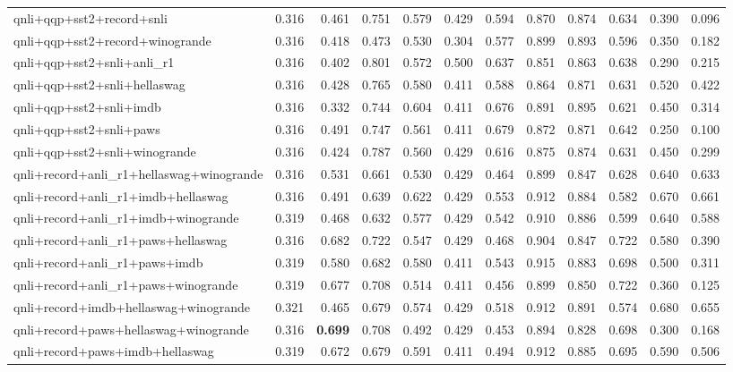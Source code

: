 \begin{table}[t]
\begin{tabular}{lrrrrrrrrrrr}
    qnli+qqp+sst2+record+snli & 0.316 & 0.461 & 0.751 & 0.579 & 0.429 & 0.594 & 0.870 & 0.874 & 0.634 & 0.390 & 0.096 \\
    qnli+qqp+sst2+record+winogrande & 0.316 & 0.418 & 0.473 & 0.530 & 0.304 & 0.577 & 0.899 & 0.893 & 0.596 & 0.350 & 0.182 \\
    qnli+qqp+sst2+snli+anli\_r1 & 0.316 & 0.402 & 0.801 & 0.572 & 0.500 & 0.637 & 0.851 & 0.863 & 0.638 & 0.290 & 0.215 \\
    qnli+qqp+sst2+snli+hellaswag & 0.316 & 0.428 & 0.765 & 0.580 & 0.411 & 0.588 & 0.864 & 0.871 & 0.631 & 0.520 & 0.422 \\
    qnli+qqp+sst2+snli+imdb & 0.316 & 0.332 & 0.744 & 0.604 & 0.411 & 0.676 & 0.891 & 0.895 & 0.621 & 0.450 & 0.314 \\
    qnli+qqp+sst2+snli+paws & 0.316 & 0.491 & 0.747 & 0.561 & 0.411 & 0.679 & 0.872 & 0.871 & 0.642 & 0.250 & 0.100 \\
    qnli+qqp+sst2+snli+winogrande & 0.316 & 0.424 & 0.787 & 0.560 & 0.429 & 0.616 & 0.875 & 0.874 & 0.631 & 0.450 & 0.299 \\
    qnli+record+anli\_r1+hellaswag+winogrande & 0.316 & 0.531 & 0.661 & 0.530 & 0.429 & 0.464 & 0.899 & 0.847 & 0.628 & 0.640 & 0.633 \\
    qnli+record+anli\_r1+imdb+hellaswag & 0.316 & 0.491 & 0.639 & 0.622 & 0.429 & 0.553 & 0.912 & 0.884 & 0.582 & 0.670 & 0.661 \\
    qnli+record+anli\_r1+imdb+winogrande & 0.319 & 0.468 & 0.632 & 0.577 & 0.429 & 0.542 & 0.910 & 0.886 & 0.599 & 0.640 & 0.588 \\
    qnli+record+anli\_r1+paws+hellaswag & 0.316 & 0.682 & 0.722 & 0.547 & 0.429 & 0.468 & 0.904 & 0.847 & 0.722 & 0.580 & 0.390 \\
    qnli+record+anli\_r1+paws+imdb & 0.319 & 0.580 & 0.682 & 0.580 & 0.411 & 0.543 & 0.915 & 0.883 & 0.698 & 0.500 & 0.311 \\
    qnli+record+anli\_r1+paws+winogrande & 0.319 & 0.677 & 0.708 & 0.514 & 0.411 & 0.456 & 0.899 & 0.850 & 0.722 & 0.360 & 0.125 \\
    qnli+record+imdb+hellaswag+winogrande & 0.321 & 0.465 & 0.679 & 0.574 & 0.429 & 0.518 & 0.912 & 0.891 & 0.574 & 0.680 & 0.655 \\
    qnli+record+paws+hellaswag+winogrande & 0.316 & \textbf{0.699} & 0.708 & 0.492 & 0.429 & 0.453 & 0.894 & 0.828 & 0.698 & 0.300 & 0.168 \\
    qnli+record+paws+imdb+hellaswag & 0.319 & 0.672 & 0.679 & 0.591 & 0.411 & 0.494 & 0.912 & 0.885 & 0.695 & 0.590 & 0.506 \\

\end{tabular}
\end{table}

